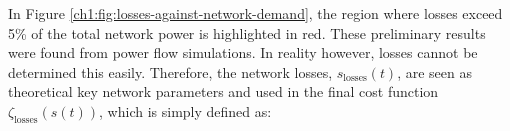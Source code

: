 


In Figure \ref{ch1:fig:losses-against-network-demand}, the region where losses exceed 5\% of the total network power is highlighted in red.
These preliminary results were found from power flow simulations.
In reality however, losses cannot be determined this easily.
Therefore, the network losses, $s_\text{losses}(t)$, are seen as theoretical key network parameters and used in the final cost function $\zeta_\text{losses}(s(t))$, which is simply defined as:



